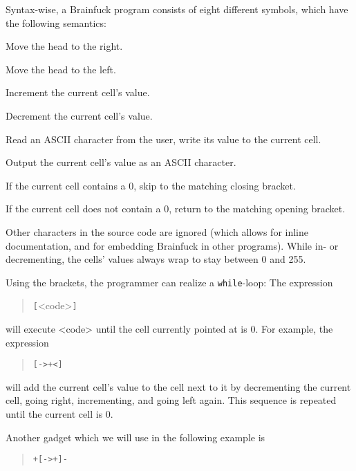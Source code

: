Syntax-wise, a Brainfuck program consists of eight different symbols, which have the following semantics:

\begin{description}[labelsep=1em]
    \item[\texttt{>}] Move the head to the right.
    \item[\texttt{<}] Move the head to the left.
    \item[\texttt{+}] Increment the current cell's value.
    \item[\texttt{-}] Decrement the current cell's value.
    \item[\texttt{,}] Read an ASCII character from the user, write its value to the current cell.
    \item[\texttt{.}] Output the current cell's value as an ASCII character.
    \item[\texttt{[}] If the current cell contains a 0, skip to the matching closing bracket.
    \item[\texttt{]}] If the current cell does not contain a 0, return to the matching opening bracket.
\end{description}

Other characters in the source code are ignored (which allows for inline documentation, and for embedding Brainfuck in other programs). While in- or decrementing, the cells' values always wrap to stay between 0 and 255.

Using the brackets, the programmer can realize a \texttt{while}-loop: The expression

\begin{quotation}
    \texttt{[}<code>\texttt{]}
\end{quotation}

will execute <code> until the cell currently pointed at is 0. For example, the expression

\begin{quotation}
    \texttt{[->+<]}
\end{quotation}

will add the current cell's value to the cell next to it by decrementing the current cell, going right, incrementing, and going left again. This sequence is repeated until the current cell is 0.

Another gadget which we will use in the following example is

\begin{quotation}
    \texttt{+[->+]-}
\end{quotation}

